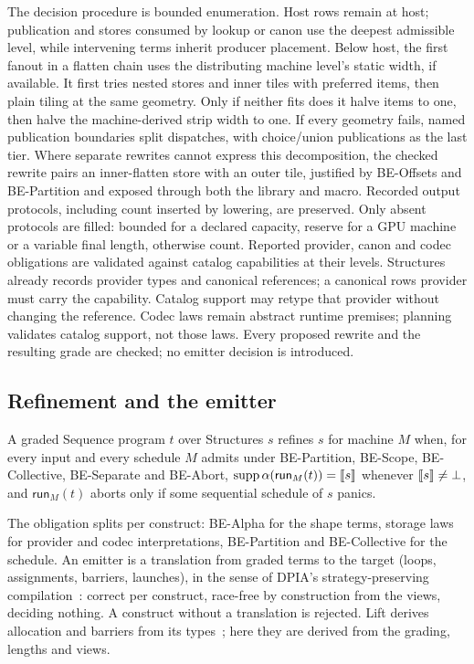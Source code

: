 The decision procedure is bounded enumeration. Host rows remain at host;
publication and stores consumed by lookup or canon use the deepest
admissible level, while intervening terms inherit producer placement.
Below host, the first fanout in a flatten chain uses the distributing
machine level's static width, if available. It first tries nested stores and
inner tiles with preferred items, then plain tiling at the same geometry.
Only if neither fits does it halve items to one, then halve the machine-derived
strip width to one. If every geometry fails, named publication boundaries
split dispatches, with choice/union publications as the last tier. Where separate
rewrites cannot express this decomposition, the checked 
rewrite pairs an inner-flatten store with an outer tile, justified by
BE-Offsets and BE-Partition and exposed through both the library and macro.
Recorded output protocols, including count inserted by lowering, are preserved. Only absent
protocols are filled: bounded for a declared capacity, reserve for a GPU
machine or a variable final length, otherwise count.
Reported provider, canon and codec obligations are validated
against catalog capabilities at their levels. Structures already records
provider types and canonical references; a canonical rows provider must carry
the  capability. Catalog support may retype that provider without changing the reference.
Codec laws remain abstract runtime premises; planning validates
catalog support, not those laws. Every proposed rewrite and the resulting
grade are checked; no emitter decision is introduced.


\subsection{Refinement and the emitter}
\begin{definition}
A graded Sequence program $t$ over Structures $s$ refines $s$ for machine
$M$ when, for every input and every schedule $M$ admits under
BE-Partition, BE-Scope, BE-Collective, BE-Separate and BE-Abort,
$\mathrm{supp}\,\alpha(\mathsf{run}_M(t))=\llbracket s\rrbracket$ whenever $\llbracket s\rrbracket\ne\bot$,
and $\mathsf{run}_M(t)$ aborts only if some sequential schedule of $s$ panics.
\end{definition}
The obligation splits per construct: BE-Alpha for the shape terms, storage
laws for provider and codec interpretations, BE-Partition and
BE-Collective for the schedule. An emitter is a translation from graded
terms to the target (loops, assignments, barriers, launches), in the sense
of DPIA's strategy-preserving compilation~\cite{paper-dpia}: correct per
construct, race-free by construction from the views, deciding nothing. A
construct without a translation is rejected. Lift derives allocation and
barriers from its types~\cite{paper-lift}; here they are derived from the
grading, lengths and views.

